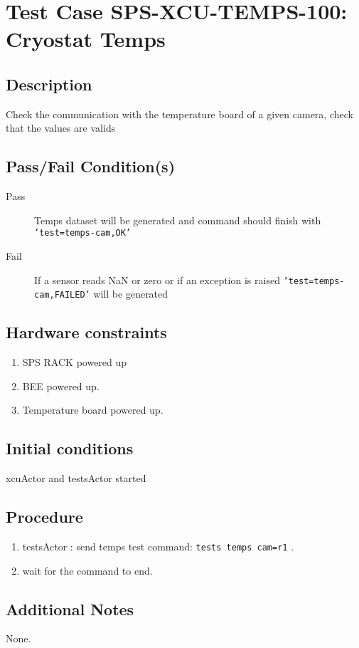 \section{Test Case SPS-XCU-TEMPS-100: Cryostat Temps}

\subsection{Description}

Check the communication with the temperature board of a given camera, check that the values are valids

\subsection{Pass/Fail Condition(s)}

\begin{description}
\item [Pass] Temps dataset will be generated and command should finish with \texttt{'test=temps-cam,OK'}
\item [Fail] If a sensor reads NaN or zero or if an exception is raised \texttt{'test=temps-cam,FAILED'} will be generated

\end{description}

\subsection{Hardware constraints}

\begin{enumerate}
    \item SPS RACK powered up
    \item BEE powered up.
    \item Temperature board powered up.
\end{enumerate}

\subsection{Initial conditions}

xcuActor and testsActor started

\subsection{Procedure}

\begin{enumerate}
    \item testsActor : send temps test command: \texttt{tests temps cam=r1} .
    \item wait for the command to end.
\end{enumerate}

\subsection{Additional Notes}
None.
